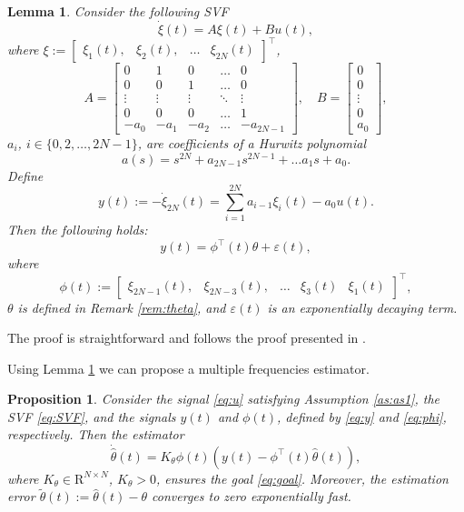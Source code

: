 \documentclass[journal, onecolumn]{IEEEtran}
\newtheorem{lem}{Lemma}
\newtheorem{prop}{Proposition}
\newcommand{\rea}{\mathrm{R}}
\newcommand{\hth}{\hat{\theta}}
\newcommand{\tth}{\tilde{\theta}}
\begin{document}
\begin{lem} \label{lem:svf}
Consider the following SVF
\begin{equation} \label{eq:SVF}
	\dot{\xi}(t) = A \xi(t) + B u(t),
\end{equation}
where $\xi:=\begin{bmatrix}\xi_1(t), & \xi_2(t), & \ldots & \xi_{2N}(t)\end{bmatrix}^\top$,
\[
	A=\begin{bmatrix}
	0 & 1 & 0 & \ldots & 0 \\ 
	0 & 0 & 1 & \ldots & 0 \\ 
	\vdots & \vdots & \vdots & \ddots & \vdots \\ 
	0 & 0 & 0 & \ldots & 1 \\ 
	-a_0 & -a_1 & -a_2 & \ldots & -a_{2N-1}
	\end{bmatrix},
	\quad
	B=\begin{bmatrix} 0 \\ 	0 \\ \vdots \\ 	0 \\ a_0 \end{bmatrix},
\]
$a_i$, $i\in\{0,2,\ldots,2N-1\}$, are coefficients of a Hurwitz polynomial 
\[
	a(s)=s^{2N} + a_{2N-1} s^{2N-1} + \ldots a_1s + a_0.
\]
Define
\begin{equation} \label{eq:y}
	y(t):=-\dot{\xi}_{2N}(t) = \sum_{i=1}^{2N}{a_{i-1}\xi_i(t)} - a_0u(t) .
\end{equation}
Then the following holds:
\begin{equation} \label{eq:reg}
	y(t) = \phi^\top(t)\theta + \varepsilon(t),
\end{equation}
where 
\begin{equation} \label{eq:phi}
	\phi(t):=\begin{bmatrix} \xi_{2N-1}(t), & \xi_{2N-3}(t),  & \ldots & \xi_3(t) & \xi_1(t) \end{bmatrix}^\top,
\end{equation}
$\theta$ is defined in Remark \ref{rem:theta}, and $\varepsilon(t)$ is an exponentially decaying term. \end{lem}
The proof is straightforward and follows the proof presented in \cite{pyrkin2015estimation}.

Using Lemma \ref{lem:svf} we can propose a multiple frequencies estimator.

\begin{prop} \label{prop:estim}
Consider the signal \eqref{eq:u} satisfying Assumption \ref{as:as1}, the SVF \eqref{eq:SVF}, and the signals $y(t)$ and $\phi(t)$, defined by \eqref{eq:y} and \eqref{eq:phi}, respectively. Then the estimator
\begin{equation} \label{eq:hattheta}
	\dot{\hth}(t) = K_\theta\phi(t)(y(t) - \phi^\top(t)\hth(t)),
\end{equation}
where $K_\theta\in\rea^{N\times N}$, $K_\theta>0$, ensures the goal \eqref{eq:goal}. Moreover, the estimation error $\tth(t):=\hth(t)-\theta$ converges to zero exponentially fast. \end{prop}
\end{document}
